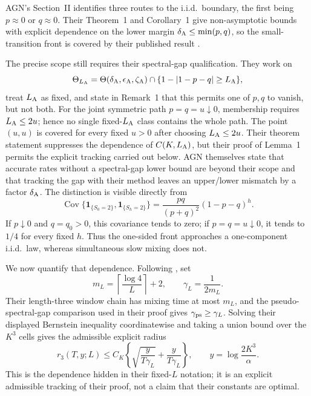 \begin{remark}
\label{rem:agn-small-transition}
AGN's Section~II identifies three routes to the i.i.d.\ boundary, the first
being \(p\approx0\) or \(q\approx0\).  Their Theorem~1 and Corollary~1 give
non-asymptotic bounds with explicit dependence on the lower margin
\(\delta_{\rm A}\leq\min(p,q)\), so the small-transition front is covered by
their published result
\cite[Section~II, Theorem~1 and Corollary~1]{AbrahamGassiatNaulet2023}.

The precise scope still requires their spectral-gap qualification.  They work
on
\[
 \Theta_{L_{\rm A}}
 =\Theta(\delta_{\rm A},\epsilon_{\rm A},\zeta_{\rm A})
 \cap\{1-|1-p-q|\geq L_{\rm A}\},
\]
treat \(L_{\rm A}\) as fixed, and state in Remark~1 that this permits one of
\(p,q\) to vanish, but not both.  For the joint symmetric path
\(p=q=u\downarrow0\), membership requires \(L_{\rm A}\leq2u\); hence no single
fixed-\(L_{\rm A}\) class contains the whole path.  The point
\((u,u)\) is covered for every fixed \(u>0\) after choosing
\(L_{\rm A}\leq2u\).  Their theorem statement suppresses the dependence of
\(C(K,L_{\rm A})\), but their proof of Lemma~1 permits the explicit tracking
carried out below.  AGN themselves state that accurate rates without a
spectral-gap lower bound are beyond their scope and that tracking the gap with
their method leaves an upper/lower mismatch by a factor
\(\delta_{\rm A}\).
The distinction is visible directly from
\[
 \operatorname{Cov}\{\mathbf 1_{\{S_0=2\}},\mathbf 1_{\{S_h=2\}}\}
 =\frac{pq}{(p+q)^2}(1-p-q)^h.
\]
If \(p\downarrow0\) and \(q=q_0>0\), this covariance tends to zero; if
\(p=q=u\downarrow0\), it tends to \(1/4\) for every fixed \(h\).  Thus the
one-sided front approaches a one-component i.i.d.\ law, whereas simultaneous
slow mixing does not.
\end{remark}

We now quantify that dependence.  Following
\cite[proof of Lemma~1]{AbrahamGassiatNaulet2023}, set
\begin{equation}
 m_L=\left\lceil\frac{\log4}{L}\right\rceil+2,
 \qquad
 \gamma_L=\frac1{2m_L}.
 \label{eq:agn-explicit-gap}
\end{equation}
Their length-three window chain has mixing time at most \(m_L\), and the
pseudo-spectral-gap comparison used in their proof gives
\(\gamma_{\rm ps}\geq\gamma_L\).  Solving their displayed Bernstein
inequality coordinatewise and taking a union bound over the \(K^3\) cells
gives the admissible explicit radius
\begin{equation}
 r_3(T,y;L)
 \leq C_K\left\{
 \sqrt{\frac{y}{T\gamma_L}}
 +\frac{y}{T\gamma_L}
 \right\},
 \qquad
 y=\log\frac{2K^3}{\alpha}.
 \label{eq:agn-explicit-moment-radius}
\end{equation}
This is the dependence hidden in their fixed-\(L\) notation; it is an
explicit admissible tracking of their proof, not a claim that their constants
are optimal.

